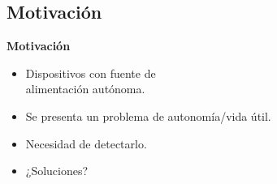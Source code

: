 \documentclass[aspectratio=43, handout]{beamer}
\begin{document}
\subsection[Motivación]{Motivación}

\begin{frame}{\textbf{\LARGE{Motivación}}}
\fontsize{16pt}{16}\selectfont
	\begin{itemize}
		\item Dispositivos con fuente de\\alimentación autónoma.
		\vspace{10px}
		\item Se presenta un problema de autonomía/vida útil.
		\vspace{10px}
		\item Necesidad de detectarlo.
		\vspace{10px}
		\item ¿Soluciones?
	\end{itemize}
\end{frame}
\end{document}
